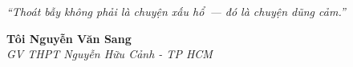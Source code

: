 \begin{center}
\textit{\color{orange}``Thoát bẫy không phải là chuyện xấu hổ~--- đó là chuyện dũng cảm.''}
\end{center}

\begin{flushright}
\textbf{Tôi Nguyễn Văn Sang}\\
\textit{GV THPT Nguyễn Hữu Cảnh - TP HCM}
\end{flushright}

\ngancach
